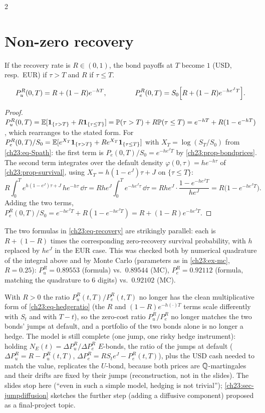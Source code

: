 \begin{paracol}{2}
\section{Non-zero recovery}\label{ch23:sec-recovery}
If the recovery rate is $R\in(0,1)$, the bond payoffs at $T$ become $1$ (USD, resp.\ EUR) if $\tau>T$ and $R$ if
$\tau\le T$.
\begin{proposition}\label{ch23:prop-recovery}
\begin{equation}\label{ch23:eq-recovery}
  P_u^R(0,T)=R+(1-R)e^{-hT},\qquad\qquad P_e^R(0,T)=S_0\Bigl[R+(1-R)e^{-he^JT}\Bigr].
\end{equation}
\end{proposition}
\begin{proof}
$P_u^R(0,T)=\mathbb{E}[\mathbf{1}_{\{\tau>T\}}+R\mathbf{1}_{\{\tau\le T\}}]=\mathbb{P}(\tau>T)+R\mathbb{P}(\tau\le T)=e^{-hT}+R(1-e^{-hT})$, which
rearranges to the stated form. For $P_e^R(0,T)/S_0=\mathbb{E}[e^{X_T}\mathbf{1}_{\{\tau>T\}}+Re^{X_T}\mathbf{1}_{\{\tau\le T\}}]$ with
$X_T=\log(S_T/S_0)$ from \cref{ch23:eq-Spath}: the first term is $P_e(0,T)/S_0=e^{-he^JT}$ by
\cref{ch23:prop-bondprices}. The second term integrates over the default density $\varphi(0,\tau)=he^{-h\tau}$ of
\cref{ch23:prop-survival}, using $X_T=h(1-e^J)\tau+J$ on $\{\tau\le T\}$:
\[
  R\int_0^Te^{h(1-e^J)\tau+J}\,he^{-h\tau}\,\dd\tau
  =Rhe^J\!\int_0^Te^{-he^J\tau}\,\dd\tau
  =Rhe^J\cdot\frac{1-e^{-he^JT}}{he^J}
  =R\bigl(1-e^{-he^JT}\bigr).
\]
Adding the two terms, $P_e^R(0,T)/S_0=e^{-he^JT}+R(1-e^{-he^JT})=R+(1-R)e^{-he^JT}$.
\end{proof}
The two formulas in \cref{ch23:eq-recovery} are strikingly parallel: each is $R+(1-R)$ times the corresponding
zero-recovery survival probability, with $h$ replaced by $he^J$ in the EUR case. This was checked both by
numerical quadrature of the integral above and by Monte Carlo (parameters as in \cref{ch23:ex-mc}, $R=0.25$):
$P_u^R=0.89553$ (formula) vs.\ $0.89544$ (MC), $P_e^R=0.92112$ (formula, matching the quadrature to 6 digits) vs.\
$0.92102$ (MC).

\begin{remark}\label{ch23:rem-Rgt0}
With $R>0$ the ratio $P_u^R(t,T)/P_e^R(t,T)$ no longer has the clean multiplicative form of
\cref{ch23:eq-hedgeratio} (the $R$ and $(1-R)e^{-h(\cdot)T}$ terms scale differently with $S_t$ and with $T-t$), so
the zero-cost ratio $P_u^R/P_e^R$ no longer matches the two bonds' jumps at default, and a portfolio of the two bonds
alone is no longer a hedge. The model is still complete (one jump, one risky hedge instrument): holding
$N_E(t)=\Delta P_u^R/\Delta P_e^R$ $E$-bonds, the ratio of the jumps at default
($\Delta P_u^R=R-P_u^R(t,T)$, $\Delta P_e^R=RS_te^J-P_e^R(t,T)$), plus the USD cash needed to match the value,
replicates the $U$-bond, because both prices are $\mathbb{Q}$-martingales and their drifts are fixed by their jumps
(reconstruction, not in the slides). The slides stop here (``even in such a simple model,
hedging is not trivial''); \cref{ch23:sec-jumpdiffusion} sketches the further step (adding a diffusive component)
proposed as a final-project topic.
\end{remark}


\end{paracol}

